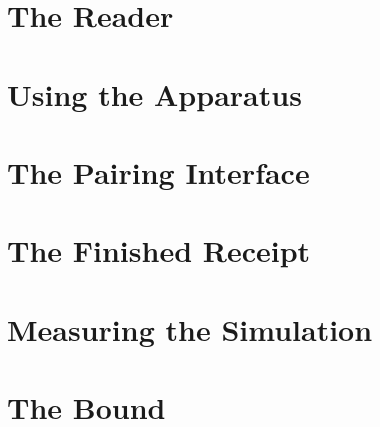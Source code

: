 \documentclass[12pt,oneside]{book}
\begin{document}
\part{The Reader}





\part{Using the Apparatus}





\part{The Pairing Interface}





\part{The Finished Receipt}


\part{Measuring the Simulation}


\part{The Bound}

\end{document}
